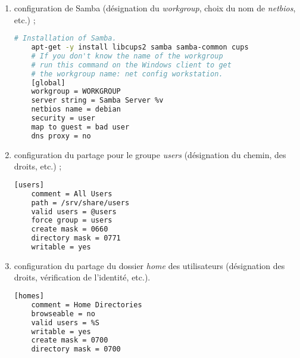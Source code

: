 \begin{enumerate}
\item configuration de Samba (désignation du \emph{workgroup}, choix
  du nom de \emph{netbios}, etc.) ;

  \begin{lstlisting}[language=bash]
    # Installation of Samba.
    apt-get -y install libcups2 samba samba-common cups
    # If you don't know the name of the workgroup
    # run this command on the Windows client to get
    # the workgroup name: net config workstation.
    [global]
    workgroup = WORKGROUP
    server string = Samba Server %v
    netbios name = debian
    security = user
    map to guest = bad user
    dns proxy = no
  \end{lstlisting}

\item configuration du partage pour le groupe \og \textit{users} \fg
  (désignation du chemin, des droits, etc.) ;

  \begin{lstlisting}[language=bash]
    [users]
    comment = All Users
    path = /srv/share/users
    valid users = @users
    force group = users
    create mask = 0660
    directory mask = 0771
    writable = yes
  \end{lstlisting}

\item configuration du partage du dossier \og \textit{home} \fg des utilisateurs
  (désignation des droits, vérification de l'identité, etc.).

  \begin{lstlisting}[language=bash]
    [homes]
    comment = Home Directories
    browseable = no
    valid users = %S
    writable = yes
    create mask = 0700
    directory mask = 0700
  \end{lstlisting}
\end{enumerate}

